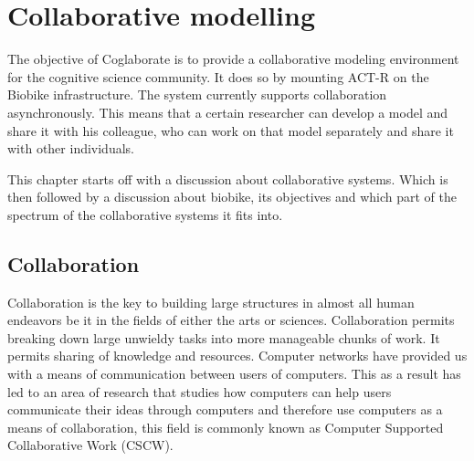 
\chapter{Collaborative modelling}
\label{chap-four}


The objective of Coglaborate is to provide a collaborative modeling
environment for the cognitive science community. It does so by
mounting ACT-R on the Biobike infrastructure. The system currently
supports collaboration asynchronously. This means that a certain
researcher can develop a model and share it with his colleague, who
can work on that model separately and share it with other individuals.


This chapter starts off with a discussion about collaborative
systems. Which is then followed by a discussion about biobike, its
objectives and which part of the spectrum of the collaborative systems
it fits into. 

\section{Collaboration}
Collaboration is the key to building large structures in almost all
human endeavors be it in the fields of either the arts or
sciences. Collaboration permits breaking down large unwieldy tasks
into more manageable chunks of work. It permits sharing of knowledge
and resources. Computer networks have provided us with a means of
communication between users of computers. This as a result has led to
an area of research that studies how computers can help users
communicate their ideas through computers and therefore use computers
as a means of collaboration, this field is commonly known as Computer
Supported Collaborative Work (CSCW).

